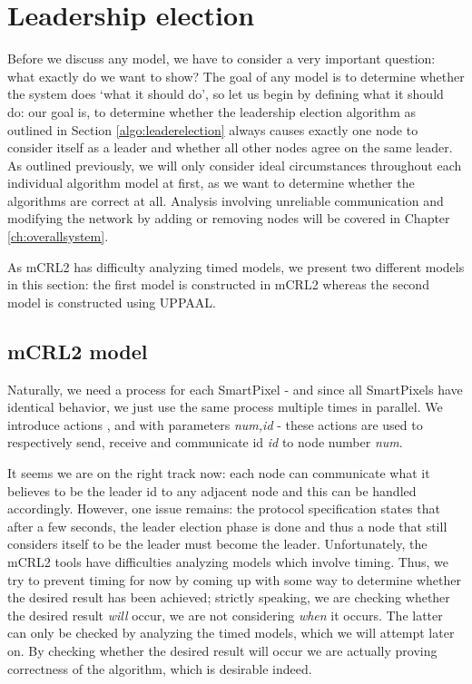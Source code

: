 \chapter{Leadership election}
\label{ch:leaderelection}

Before we discuss any model, we have to consider a very important question: what exactly do we want to show? The goal of any model is to determine whether the system does `what it should do', so let us begin by defining what it should do: our goal is, to determine whether the leadership election algorithm as outlined in Section \ref{algo:leaderelection} always causes exactly one node to consider itself as a leader and whether all other nodes agree on the same leader. As outlined previously, we will only consider ideal circumstances throughout each individual algorithm model at first, as we want to determine whether the algorithms are correct at all. Analysis involving unreliable communication and modifying the network by adding or removing nodes will be covered in Chapter \ref{ch:overallsystem}.

As mCRL2 has difficulty analyzing timed models, we present two different models in this section: the first model is constructed in mCRL2 whereas the second model is constructed using UPPAAL.

\section{mCRL2 model}
\label{model:elect}


Naturally, we need a process for each SmartPixel - and since all SmartPixels have identical behavior, we just use the same process multiple times in parallel. We introduce actions ,  and  with parameters \emph{num,id} - these actions are used to respectively send, receive and communicate id \emph{id} to node number \emph{num}.

It seems we are on the right track now: each node can communicate what it believes to be the leader id to any adjacent node and this can be handled accordingly. However, one issue remains: the protocol specification states that after a few seconds, the leader election phase is done and thus a node that still considers itself to be the leader must become the leader. Unfortunately, the mCRL2 tools have difficulties analyzing models which involve timing. Thus, we try to prevent timing for now by coming up with some way to determine whether the desired result has been achieved; strictly speaking, we are checking whether the desired result \emph{will} occur, we are not considering \emph{when} it occurs. The latter can only be checked by analyzing the timed models, which we will attempt later on. By checking whether the desired result will occur we are actually proving correctness of the algorithm, which is desirable indeed.

